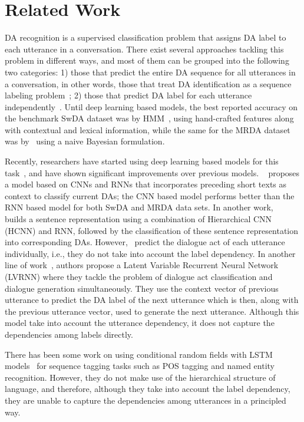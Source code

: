 \documentclass[letterpaper]{article} \usepackage{aaai18}
\begin{document}
 \section{Related Work}
\label{sec:related}
DA recognition is a supervised classification problem that assigns DA label to each utterance in a conversation.
There exist several approaches tackling this problem in different ways, and most of them can be grouped into the following two categories: 1) those that predict the entire DA sequence for all utterances in a conversation, in other words, those that treat DA identification as a sequence labeling problem~\cite{Stolcke2006,Lendvai2007,Zimmermann2009,Lee2016}; 2) those that predict DA label for each utterance independently~\cite{Tavafi2013,Khanpour2016,Ji2016}. Until deep learning based models, the best reported accuracy on the benchmark SwDA dataset was  by HMM~\cite{Stolcke2006}, using hand-crafted features along with contextual and lexical information, while the same for the MRDA dataset was  by~\cite{Lendvai2007} using a naive Bayesian formulation.

Recently, researchers have started using deep learning based models for this task~\cite{Lee2016,Khanpour2016,Tavafi2013}, and have shown significant improvements over previous models. ~\cite{Lee2016} proposes a model based on CNNs and RNNs that incorporates preceding short texts as context to classify current DAs; the CNN based model performs better than the RNN based model for both SwDA and MRDA data sets. In another work, ~\cite{Blunsom2013} builds a sentence representation using a combination of Hierarchical CNN (HCNN) and RNN, followed by the classification of these sentence representation into corresponding DAs. However,~\cite{Blunsom2013} predict the dialogue act of each utterance individually, i.e., they do not take into account the label dependency. In another line of work~\cite{Ji2016}, authors propose a Latent Variable Recurrent Neural Network (LVRNN) where they tackle the problem of dialogue act classification and dialogue generation simultaneously. They use the context vector of previous utterance to predict the DA label of the next utterance which is then, along with the previous utterance vector, used to generate the next utterance. Although this model take into account the utterance dependency, it does not capture the dependencies among labels directly.

There has been some work on using conditional random fields with LSTM models~\cite{Huang2015,Ma2016} for sequence tagging tasks such as POS tagging and named entity recognition. However, they do not make use of the hierarchical structure of language, and therefore, although they take into account the label dependency, they are unable to capture the dependencies among utterances in a principled way. 
\end{document}
